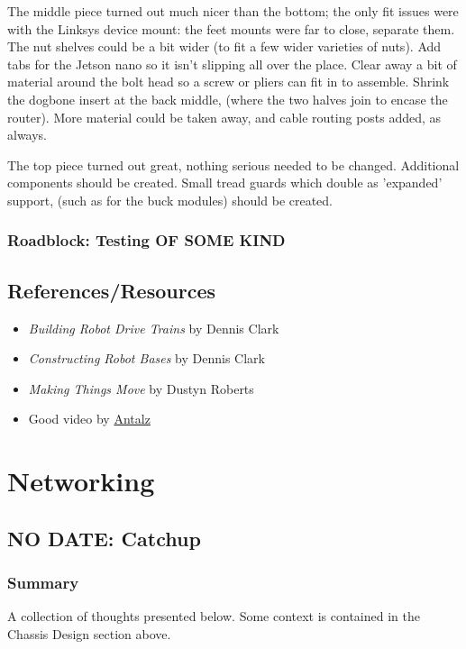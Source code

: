 \documentclass[a4paper, 10pt]{article}
\begin{document}
		The middle piece turned out much nicer than the bottom; the only fit issues were with the Linksys device mount: the feet mounts were far to close, separate them. The nut shelves could be a bit wider (to fit a few wider varieties of nuts). Add tabs for the Jetson nano so it isn't slipping all over the place. Clear away a bit of material around the bolt head so a screw or pliers can fit in to assemble. Shrink the dogbone insert at the back middle, (where the two halves join to encase the router). More material could be taken away, and cable routing posts added, as always. 
		
		The top piece turned out great, nothing serious needed to be changed. Additional components should be created. Small tread guards which double as 'expanded' support, (such as for the buck modules) should be created. 
		
		
		\subsubsection{Roadblock: Testing OF SOME KIND}
	
		
	\subsection{References/Resources}
	\begin{itemize}
		\item \textit{Building Robot Drive Trains} by Dennis Clark
		\item \textit{Constructing Robot Bases} by Dennis Clark
		\item \textit{Making Things Move} by Dustyn Roberts
		\item Good video by \href{https://www.youtube.com/watch?v=HiSOCPizpCo}{Antalz}
	\end{itemize}	
		
	
\section{Networking}
	\subsection{NO DATE: Catchup}
		\subsubsection{Summary}
		A collection of thoughts presented below. Some context is contained in the Chassis Design section above. 
		
\end{document}
